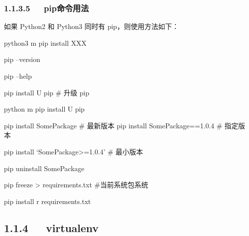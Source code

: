 \documentclass[letterpaper,12pt,english]{sphinxmanual}
\begin{document}
\subsubsection{1.1.3.5   pip命令用法}
\label{\detokenize{001software/001install/python:id5}}
\begin{DUlineblock}{0em}
\item[] 如果 Python2 和 Python3 同时有 pip，则使用方法如下：
\item[] python3 \sphinxhyphen{}m pip install XXX
\end{DUlineblock}

\begin{DUlineblock}{0em}
\item[] pip –version
\item[] pip –help
\item[] pip install \sphinxhyphen{}U pip \# 升级 pip
\item[] python \sphinxhyphen{}m pip install \sphinxhyphen{}U pip
\item[] pip install SomePackage \# 最新版本 pip install SomePackage==1.0.4 \#
指定版本
\item[] pip install ‘SomePackage>=1.0.4’ \# 最小版本
\item[] pip uninstall SomePackage
\end{DUlineblock}

\begin{DUlineblock}{0em}
\item[] pip freeze > requirements.txt \#当前系统包系统
\item[] pip install \sphinxhyphen{}r requirements.txt
\end{DUlineblock}


\subsection{1.1.4   virtualenv}
\label{\detokenize{001software/001install/python:virtualenv}}

\begin{sphinxVerbatim}[commandchars=\\\{\}]
  
\PYGZbs{}\PYGZbs{}\PYGZbs{}\PYGZbs{}\PYGZbs{}
\end{sphinxVerbatim}
\end{document}
